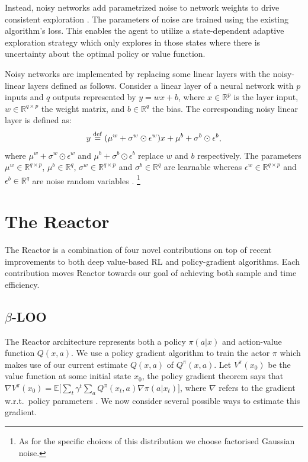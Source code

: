 \documentclass{article}
\newcommand{\E}{{\mathbb E}}
\newcommand{\eqdef}{\stackrel{\rm def}{=}}
\newcommand{\todo}[1]{{\bf[#1]}}
\begin{document}
Instead, noisy networks add parametrized noise to network weights to drive 
consistent exploration \citep{fortunato2017noisy}.
The parameters of noise are trained using the existing algorithm's loss. This 
enables the agent to utilize a 
state-dependent adaptive exploration strategy which only explores in those 
states where there is uncertainty about the optimal policy or value function. 

Noisy networks are implemented by replacing some linear layers with the 
noisy-linear layers defined as 
follows. Consider a linear layer of a neural network with $p$ inputs and $q$ 
outputs represented by 
$y = wx + b$, where $x\in \mathbb{R}^{p}$ is the layer input, 
$w\in\mathbb{R}^{q\times p}$ 
the weight matrix, and $b\in\mathbb{R}^q$ the bias. The corresponding noisy 
linear layer is defined as:
\begin{equation}\label{eq:param}
y\eqdef(\mu^w+\sigma^w\odot\epsilon^w) x+ \mu^b  +\sigma^b\odot\epsilon^b ,
\end{equation}
where  $\mu^w+\sigma^w\odot\epsilon^w$ and $\mu^b  +\sigma^b\odot\epsilon^b$ 
replace $w$ and $b$ respectively.  The parameters 
$\mu^w\in \mathbb{R}^{q\times p}$, $\mu^b\in \mathbb{R}^{q}$, $\sigma^w\in 
\mathbb{R}^{q\times p}$ and $\sigma^b\in \mathbb{R}^{q}$ are learnable whereas 
$\epsilon^w\in \mathbb{R}^{q\times p}$  and $\epsilon^b\in \mathbb{R}^{q}$ are 
noise random variables \citep{fortunato2017noisy}.
\footnote{As for the specific choices of this distribution we choose factorised 
Gaussian 
noise.}
\fi 

\section{The Reactor}\label{sec:reactor}
The Reactor is a combination of four novel contributions on top of recent 
improvements to both 
deep value-based RL and policy-gradient algorithms. 
Each contribution moves Reactor towards our goal of achieving both sample and time efficiency.

\subsection{$\beta$-LOO}\label{sec:betaloo}

The Reactor architecture represents both a policy $\pi(a|x)$ and action-value function 
$Q(x,a)$. We use a policy gradient algorithm to train the actor $\pi$ which 
makes use of our current estimate $Q(x,a)$ of $Q^{\pi}(x,a)$.  
Let $V^{\pi}(x_0)$ be the value function at some initial state $x_0$, the 
policy gradient theorem says that $\nabla 
V^{\pi}(x_0) = \E\big[\sum_t \gamma^t \sum_a Q^{\pi}(x_t,a) \nabla \pi(a|x_t) 
\big]$, where $\nabla$ refers to the gradient w.r.t.~policy parameters \citep{Sutton00policygradient}. We now 
consider several possible ways to estimate this gradient.
\end{document}
